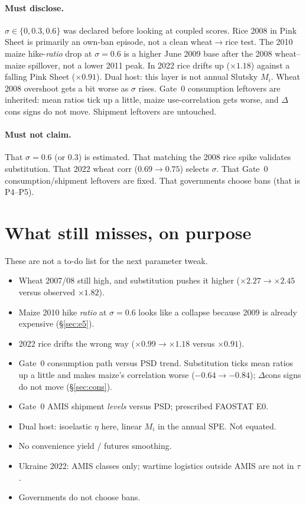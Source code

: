 \documentclass[11pt,a4paper]{article}
\begin{document}
\paragraph{Must disclose.}
\(\sigma\in\{0,0.3,0.6\}\) was declared before looking at coupled scores.
Rice 2008 in Pink Sheet is primarily an own-ban episode, not a clean
wheat\(\to\)rice test. The 2010 maize hike-\emph{ratio} drop at
\(\sigma=0.6\) is a higher June 2009 base after the 2008 wheat--maize
spillover, not a lower 2011 peak. In 2022 rice drifts up
(\(\times 1.18\)) against a falling Pink Sheet (\(\times 0.91\)). Dual
host: this layer is not annual Slutsky \(M_i\). Wheat 2008 overshoot gets
a bit worse as \(\sigma\) rises. Gate~0 consumption leftovers are
inherited: mean ratios tick up a little, maize use-correlation gets worse,
and \(\Delta\)cons signs do not move. Shipment leftovers are untouched.

\paragraph{Must not claim.}
That \(\sigma=0.6\) (or \(0.3\)) is estimated. That matching the 2008 rice
spike validates substitution. That 2022 wheat corr (\(0.69\to 0.75\))
selects \(\sigma\). That Gate~0 consumption/shipment leftovers are fixed.
That governments choose bans (that is P4--P5).

\section{What still misses, on purpose}
\label{sec:leftovers}

These are not a to-do list for the next parameter tweak.

\begin{itemize}
\item Wheat 2007/08 still high, and substitution pushes it higher
      (\(\times 2.27\to\times 2.45\) versus observed \(\times 1.82\)).
\item Maize 2010 hike \emph{ratio} at \(\sigma=0.6\) looks like a collapse
      because 2009 is already expensive (\S\ref{sec:e5}).
\item 2022 rice drifts the wrong way (\(\times 0.99\to\times 1.18\) versus
      \(\times 0.91\)).
\item Gate~0 consumption path versus PSD trend. Substitution ticks mean
      ratios up a little and makes maize's correlation worse
      (\(-0.64\to -0.84\)); \(\Delta\)cons signs do not move
      (\S\ref{sec:cons}).
\item Gate~0 AMIS shipment \emph{levels} versus PSD; prescribed FAOSTAT E0.
\item Dual host: isoelastic \(\eta\) here, linear \(M_i\) in the annual
      SPE. Not equated.
\item No convenience yield / futures smoothing.
\item Ukraine 2022: AMIS classes only; wartime logistics outside AMIS are
      not in \(\tau\).
\item Governments do not choose bans.
\end{itemize}
\end{document}
